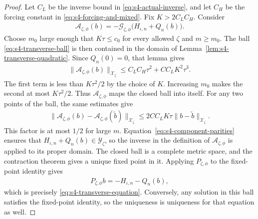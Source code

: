 \documentclass[a4paper,11pt,oneside,reqno]{amsart}
\numberwithin{equation}{section}
\theoremstyle{definition}
\begin{document}
\begin{proof}
    Let $C_L$ be the inverse bound in
    \eqref{eq:s4-actual-inverse}, and let $C_H$ be the forcing
    constant in \eqref{eq:s4-forcing-and-mixed}. Fix
    $K>2C_LC_H$. Consider
    \begin{align}
        \label{eq:s4-transverse-contraction}
        \mathcal{A}_{\zeta,\phi}(b)
        =-\mathscr{G}_{\zeta,\phi}\bigl(H_{\iota,n}+Q_n(b)\bigr).
    \end{align}
    Choose $m_0$ large enough that $K\tau\leq c_0$ for
    every allowed $\zeta$ and $m\geq m_0$. The ball
    \eqref{eq:s4-transverse-ball} is then contained in
    the domain of Lemma~\ref{lem:s4-transverse-quadratic}.
    Since $Q_n(0)=0$, that lemma gives
    \begin{align*}
        \|\mathcal{A}_{\zeta,\phi}(b)\|_{\mathcal{X}_\zeta}
        \leq C_LC_H\tau^2+CC_LK^2\tau^3.
    \end{align*}
    The first term is less than $K\tau^2/2$ by the choice
    of $K$. Increasing $m_0$ makes the second at most
    $K\tau^2/2$. Thus $\mathcal A_{\zeta,\phi}$ maps the
    closed ball into itself. For any two points of the ball,
    the same estimates give
    \begin{align*}
        \|\mathcal A_{\zeta,\phi}(b)
                  -\mathcal A_{\zeta,\phi}(\widetilde b)
                       \|_{\mathcal X_\zeta}
        \leq2CC_LK\tau
                  \|b-\widetilde b\|_{\mathcal X_\zeta}.
    \end{align*}
    This factor is at most $1/2$ for large $m$.
    Equation~\eqref{eq:s4-component-parities} ensures that
    $H_{\iota,n}+Q_n(b)\in\mathcal Y_\zeta$, so the
    inverse in the definition of $\mathcal A_{\zeta,\phi}$
    is applied to its proper domain. The closed ball is a
    complete metric space, and the contraction theorem gives
    a unique fixed point in it. Applying $P_{\zeta,\phi}$
    to the fixed-point identity gives
    \begin{align*}
        P_{\zeta,\phi}b=-H_{\iota,n}-Q_n(b),
    \end{align*}
    which is precisely \eqref{eq:s4-transverse-equation}.
    Conversely, any solution in this ball satisfies the
    fixed-point identity, so the uniqueness is uniqueness
    for that equation as well.


\end{proof}
\end{document}
